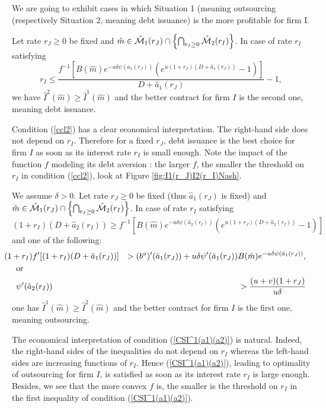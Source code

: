 \documentclass{svjour3}
\begin{document}
We are going to exhibit cases  in which Situation 1 (meaning outsourcing (respectively Situation 2, meaning debt issuance) is the more profitable for  firm I.

\begin{theorem}
 \label{prop:1stCS}
Let rate $r_J\geq 0$ be fixed and $\hat{m}\in \hat{\cal M}_1(r_J)\cap\left\{\bigcap_{r_I\geq 0}\hat{\cal M}_2(r_I)\right\}$. In case of rate $r_I$ satisfying
  \begin{equation}
 \label{ccl2}
 r_I \leq \frac{ f^{-1}\left[
 {B(\hat m)} e^{-u\delta\psi(\hat a_1(r_J))}\left(e^{u(1+r_J)(D+\hat a_1(r_J))}-1\right)\right]}{D+\hat a_1(r_J)}-1,
 \end{equation}
we have $\hat{I}^2(\hat m)\geq \hat I^1(\hat m)$ and the better contract for firm $I$ is the second one, meaning debt issuance.
 \end{theorem}
Condition (\ref{ccl2}) has a clear economical interpretation. The right-hand side  does not depend on $r_I$. Therefore for a fixed $r_J$, debt issuance is the best  choice  for firm $I$ as soon as its interest rate $r_I$  is small enough. Note the impact  of the function $f$ modeling its debt aversion : the larger $f$, the smaller  the threshold on $r_I$ in  condition (\ref{ccl2}), look at Figure \ref{fig:I1(r_J)I2(r_I)Nash}.

\begin{theorem}
 \label{prop:2dCS}
 We assume $\delta>0.$
Let rate $r_J\geq 0$ be fixed (thus $\hat a_1(r_J)$ is fixed) and $\hat{m}\in \hat{\cal M}_1(r_J)\cap\left\{\bigcap_{r_I\geq 0}\hat{\cal M}_2(r_I)\right\}$. In case of rate $r_I$ satisfying
 \begin{equation}
 \label{ccl1}
(1+r_I)(D+\hat a_2(r_I))\geq f^{-1}\left[
 {B(\hat m)}e^{-u\delta\psi(\hat a_2(r_I))}\left(e^{u(1+r_J)(D+ \hat a_2(r_I))}-1\right)\right] 
 \end{equation}
 and one of the following:
\begin{eqnarray}
\label{CSI^1(a1)(a2)}
& \hspace{-0.5cm} (1+r_I)f'[(1+r_I)(D+\hat a_1(r_J))]&>(b^a)'(\hat a_1(r_J))+u\delta  \psi'(\hat a_1(r_J)) B(\hat m) e^{-u\delta\psi(\hat a_1(r_J))}  ,\nonumber
\\
&\mbox{or}&
\\
&\psi'(\hat a_2(r_I))&>\frac{(u+v)(1+r_J)}{u\delta} \nonumber
\end{eqnarray}
one has $\hat I^1(\hat m)\geq \hat{I}^2(\hat m)$ and 
 the better contract for  firm $I$ is the first one, meaning outsourcing.
 \end{theorem}
The economical interpretation of condition (\ref{CSI^1(a1)(a2)}) is  natural. 
Indeed, the right-hand sides of the inequalities do not depend on $r_I$ whereas the 
left-hand sides are increasing functions of $r_I$. Hence (\ref{CSI^1(a1)(a2)}), leading
 to optimality of outsourcing for firm $I$,  is satisfied as soon as its interest rate
  $r_I$ is large enough. 
Besides, we see that the more convex $f$ is, the smaller is  the threshold on $r_I$ in
 the first inequality of condition (\ref{CSI^1(a1)(a2)}).
 
\end{document}
